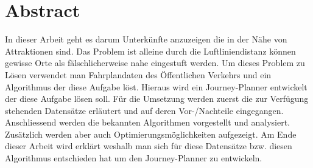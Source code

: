 \section{Abstract}
\label{abstract}
In dieser Arbeit geht es darum Unterkünfte anzuzeigen die in der Nähe von Attraktionen sind. Das Problem ist alleine durch die Luftliniendistanz können gewisse Orte als fälschlicherweise nahe eingestuft werden. Um dieses Problem zu Lösen verwendet man Fahrplandaten des Öffentlichen Verkehrs und ein Algorithmus der diese Aufgabe löst. Hieraus wird ein Journey-Planner entwickelt der diese Aufgabe lösen soll.
\newline
\newline
Für die Umsetzung werden zuerst die zur Verfügung stehenden Datensätze erläutert und auf deren Vor-/Nachteile eingegangen. Anschliessend werden die bekannten Algorithmen vorgestellt und analysiert. Zusätzlich werden aber auch Optimierungsmöglichkeiten aufgezeigt.
\newline
\newline
Am Ende dieser Arbeit wird erklärt weshalb man sich für diese Datensätze bzw. diesen Algorithmus entschieden hat um den Journey-Planner zu entwickeln.
